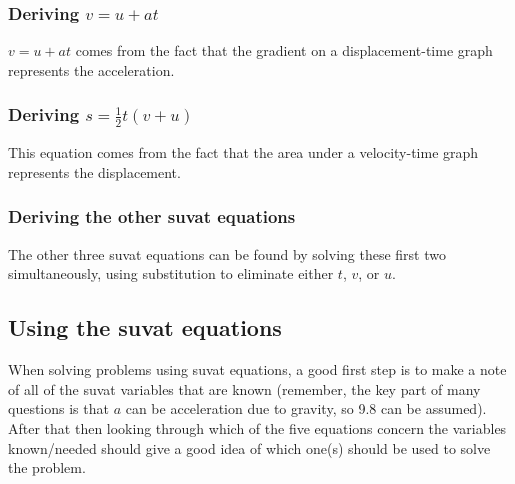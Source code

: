 \subsubsection{Deriving $v=u+at$}
$v=u+at$ comes from the fact that the gradient on a displacement-time graph represents the acceleration.
\subsubsection{Deriving $s=\frac{1}{2}t(v+u)$}
This equation comes from the fact that the area under a velocity-time graph represents the displacement.
\subsubsection{Deriving the other suvat equations}
The other three suvat equations can be found by solving these first two simultaneously, using substitution to eliminate either $t$, $v$, or $u$.

\subsection{Using the suvat equations}
When solving problems using suvat equations, a good first step is to make a note of all of the suvat variables that are known (remember, the key part of many questions is that $a$ can be acceleration due to gravity, so 9.8 can be assumed). After that then looking through which of the five equations concern the variables known/needed should give a good idea of which one(s) should be used to solve the problem.
